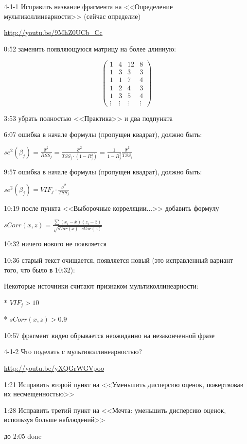\documentclass[12pt,a4paper]{article}
\begin{document}
4-1-1 Исправить название фрагмента  на <<Определение мультиколлинеарности>> (сейчас определие)

\url{http://youtu.be/9MhZ0UCb_Cc}

0:52 заменить появляющуюся матрицу на более длинную:

\[
\begin{pmatrix}
1 & 4 & 12 & 8 \\
1 & 3 & 3   & 3 \\
1 & 1 & 7   & 4 \\
1 & 2 & 4   & 3 \\
1 & 3 & 5   & 4 \\ 
\vdots & \vdots & \vdots & \vdots
\end{pmatrix}
\]

3:53 убрать полностью <<Практика>> и два подпункта

6:07 ошибка в начале формулы (пропущен квадрат), должно быть:

$se^2(\hat{\beta}_j)=\frac{\hat{\sigma}^2}{RSS_j}=\frac{\hat{\sigma}^2}{TSS_j\cdot (1-R^2_j)}=
\frac{1}{1-R^2_j}\frac{\hat{\sigma}^2}{TSS_j}$

9:57 ошибка в начале формулы (пропущен квадрат), должно быть:

$se^2(\hat{\beta}_j)=VIF_j \cdot \frac{\hat{\sigma}^2}{TSS_j}$

10:19 после пункта <<Выборочные корреляции...>> добавить формулу

$sCorr(x,z)=\frac{\sum (x_i - \bar{x}) (z_i - \bar{z}) }{\sqrt{sVar(x) \cdot sVar(z)}}$

10:32 ничего нового не появляется

10:36 старый текст очищается, появляется новый (это исправленный вариант того, что было в 10:32):

Некоторые источники считают признаком мультиколлинеарности:

* $VIF_j > 10$

* $sCorr(x,z)>0.9$

10:57 фрагмент видео обрывается неожиданно на незаконченной фразе

4-1-2 Что поделать с мультиколлинеарностью?

\url{http://youtu.be/yXQGrWGVpoo}

1:21 Исправить второй пункт на <<Уменьшить дисперсию оценок, пожертвовав их несмещенностью>>

1:28 Исправить третий пункт на <<Мечта: уменьшить дисперсию оценок, используя больше наблюдений>>

до 2:05 done
\end{document}
